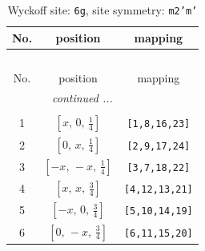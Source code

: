 \documentclass[fleqn,8pt]{jsarticle}
\begin{document}
\renewcommand{\arraystretch}{1.2}
\begin{longtable}{ccc}
\caption{Wyckoff site: {\tt 6g}, site symmetry: {\tt m2'm'}}
 \\
 \hline \hline
No. & position & mapping \\ \hline \endfirsthead

\multicolumn{2}{l}{\tablename\ \thetable{}} \\
 \hline \hline
No. & position & mapping \\ \hline \endhead

 \hline \hline
\multicolumn{2}{r}{\footnotesize\it continued ...} \\ \endfoot

 \hline \hline
\multicolumn{2}{r}{} \\ \endlastfoot

1 & $\left[ x,\, 0,\, \frac{1}{4} \right]$ & {\tt [1,8,16,23]} \\ \hline
2 & $\left[ 0,\, x,\, \frac{1}{4} \right]$ & {\tt [2,9,17,24]} \\ \hline
3 & $\left[ - x,\, - x,\, \frac{1}{4} \right]$ & {\tt [3,7,18,22]} \\ \hline
4 & $\left[ x,\, x,\, \frac{3}{4} \right]$ & {\tt [4,12,13,21]} \\ \hline
5 & $\left[ - x,\, 0,\, \frac{3}{4} \right]$ & {\tt [5,10,14,19]} \\ \hline
6 & $\left[ 0,\, - x,\, \frac{3}{4} \right]$ & {\tt [6,11,15,20]} \\
\end{longtable}
\renewcommand{\arraystretch}{1.2}
\end{document}
